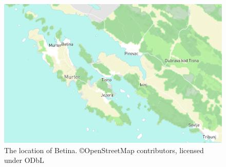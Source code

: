 \documentclass[output=paper]{LSP/langsci}
\begin{document}
\begin{figure}[t]
\includegraphics[width=\textwidth]{illustrations/skevin_betinalocation3.png}
\caption{The location of Betina.  {\tiny ©OpenStreetMap contributors, licensed under ODbL}}
\label{fig:skevin:betinalocation} 
\end{figure}
\end{document}
